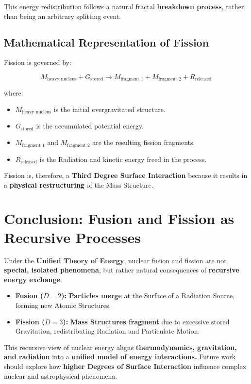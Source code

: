 \documentclass{article}
\begin{document}
This energy redistribution follows a natural fractal \textbf{breakdown process}, rather than being an arbitrary splitting event.

\subsection{Mathematical Representation of Fission}
Fission is governed by:

\begin{equation}
    M_{\text{heavy nucleus}} + G_{\text{stored}} \rightarrow M_{\text{fragment 1}} + M_{\text{fragment 2}} + R_{\text{released}}
\end{equation}

where:
\begin{itemize}
    \item $M_{\text{heavy nucleus}}$ is the initial overgravitated structure.
    \item $G_{\text{stored}}$ is the accumulated potential energy.
    \item $M_{\text{fragment 1}}$ and $M_{\text{fragment 2}}$ are the resulting fission fragments.
    \item $R_{\text{released}}$ is the Radiation and kinetic energy freed in the process.
\end{itemize}

Fission is, therefore, a \textbf{Third Degree Surface Interaction} because it results in a \textbf{physical restructuring} of the Mass Structure.

\section{Conclusion: Fusion and Fission as Recursive Processes}
Under the \textbf{Unified Theory of Energy}, nuclear fusion and fission are not \textbf{special, isolated phenomena}, but rather natural consequences of \textbf{recursive energy exchange}. 

\begin{itemize}
    \item \textbf{Fusion ($D=2$):} \textbf{Particles merge} at the Surface of a Radiation Source, forming new Atomic Structures.
    \item \textbf{Fission ($D=3$):} \textbf{Mass Structures fragment} due to excessive stored Gravitation, redistributing Radiation and Particulate Motion.
\end{itemize}

This recursive view of nuclear energy aligns \textbf{thermodynamics, gravitation, and radiation} into a \textbf{unified model of energy interactions.} Future work should explore how \textbf{higher Degrees of Surface Interaction} influence complex nuclear and astrophysical phenomena.
\end{document}
